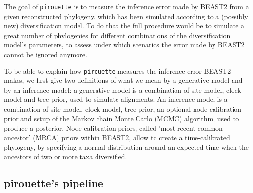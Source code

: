\documentclass{article}
\begin{document}
The goal of \verb;pirouette; is to measure the inference error made by BEAST2 from a given reconstructed phylogeny, which has been simulated according to a (possibly new) diversification model.
To do that the full procedure would be to simulate a great number of phylogenies for different combinations of the diversification model's parameters, to assess under which scenarios the error made by BEAST2 cannot be ignored anymore. 

To be able to explain how \verb;pirouette; measures the inference error
BEAST2 makes, we first give two definitions of what
we mean by a generative model and by an inference model: 
a generative model is a combination of site model, clock model and tree prior,
used to simulate alignments. An inference model is a combination of 
site model, clock model, tree prior, an optional node calibration prior
and setup of the Markov chain Monte Carlo (MCMC) algorithm, 
used to produce a posterior. Node calibration priors, called 'most
recent common ancestor' (MRCA) priors within BEAST2, allow to create a time-calibrated phylogeny, by specifying a normal distribution around an expected time when the ancestors of two or more taxa diversified. 

\subsection{pirouette's pipeline}
\end{document}
